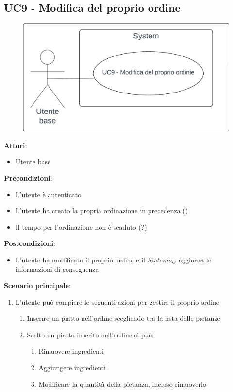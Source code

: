 \subsection{UC9 - Modifica del proprio ordine}\label{usecase:9}
\begin{figure}[H]
    \centering
    \includegraphics[width=0.9\linewidth]{ucd/ucd9.png}
\end{figure}
\textbf{Attori}:
\begin{itemize}
    \item Utente base
\end{itemize}
\textbf{Precondizioni}:
\begin{itemize}
    \item L'utente è autenticato
    \item L'utente ha creato la propria ordinazione in precedenza ()
    \item Il tempo per l'ordinazione non è scaduto (?)
\end{itemize}
\textbf{Postcondizioni}:
\begin{itemize}
    \item L'utente ha modificato il proprio ordine e il $\textit{Sistema}_G$ aggiorna le informazioni di conseguenza
\end{itemize}
\textbf{Scenario principale}:
\begin{enumerate}
    \item L'utente può compiere le seguenti azioni per gestire il proprio ordine
    \begin{enumerate}
        \item Inserire un piatto nell'ordine scegliendo tra la lista delle pietanze
        \item Scelto un piatto inserito nell'ordine si può:
        \begin{enumerate}
            \item Rimuovere ingredienti
            \item Aggiungere ingredienti
            \item Modificare la quantità della pietanza, incluso rimuoverlo
        \end{enumerate}
    \end{enumerate}
\end{enumerate}

\newpage